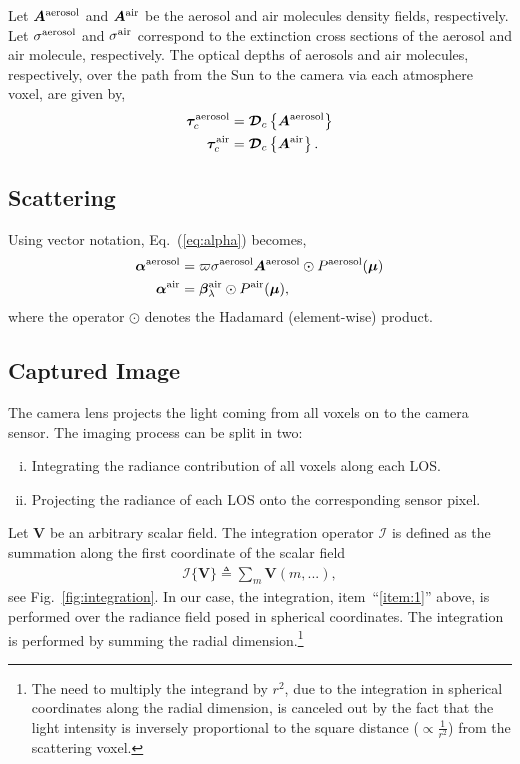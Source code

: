 \documentclass[10pt,twocolumn,letterpaper]{article}
\newcommand{\OpDistance}{\bm{\mathcal{D}}}
\newcommand{\OpInt}{\bm{\mathcal{I}}}
\newcommand{\curly}[1]{\left\{#1\right\}}
\newcommand{\vect}[1]{\bm{#1}}
\newcommand{\mat}[1]{\bm{#1}}
\begin{document}
Let $\mat{A}^{\rm aerosol}$ and $\mat{A}^{\rm air}$ be the aerosol and
air molecules density fields, respectively.  Let $\sigma^{\rm
  aerosol}$ and $ \sigma^{\rm air}$ correspond to the extinction cross
sections of the aerosol and air molecule, respectively.  The optical
depths of aerosols and air molecules, respectively, over the path from
the Sun to the camera via each atmosphere voxel, are given by,
\begin{align}
  \vect{\tau}^{\rm aerosol}_c &= \OpDistance_c \curly{ \mat{A}^{\rm
      aerosol}} \nonumber \\
  \vect{\tau}^{\rm air}_c &= \OpDistance_c \curly{ \mat{A}^{\rm air}}.
  \label{eq:tau}
\end{align}

\subsection{Scattering}
\label{sec:scattering}


\noindent Using vector notation, Eq.~(\ref{eq:alpha}) becomes,
\begin{align}
  \vect{\alpha}^{\rm aerosol} &= \varpi \sigma^{\rm aerosol}
  \mat{A}^{\rm
    aerosol} \odot P^{\rm aerosol}(\vect{\mu}) \nonumber \\
  \vect{\alpha}^{\rm air} &= \vect{\beta}^{\rm air}_{\lambda} \odot
  P^{\rm air}(\vect{\mu}),
  \label{eq:alpha_matrix}
\end{align}
where the operator $\odot$ denotes the Hadamard (element-wise)
product.



\subsection{Captured Image}
\label{sec:captured-image}

The camera lens projects the light coming from all voxels on to the
camera sensor. The imaging process can be split in two:
\begin{enumerate}[i.]
\item \label{item:1} Integrating the radiance contribution of all
  voxels along each LOS.
\item \label{item:2} Projecting the radiance of each LOS onto the
  corresponding sensor pixel.
\end{enumerate}
Let $\mat{V}$ be an arbitrary scalar field. The integration operator
$\OpInt$ is defined as the summation along the first coordinate of the
scalar field
\begin{align}
  \OpInt\{\mat{V}\} \triangleq \sum_m \mat{V}(m,...),
  \label{eq:operator_integral}
\end{align}
see Fig.~\ref{fig:integration}. In our case, the integration,
item~``\ref{item:1}'' above, is performed over the radiance field
posed in spherical coordinates. The integration is performed by
summing the radial dimension.\footnote{The need to multiply the
  integrand by $r^2$, due to the integration in spherical
  coordinates along the radial dimension, is canceled out by the
  fact that the light intensity is inversely proportional to the
  square distance ($\propto\frac{1}{r^2}$) from the scattering voxel.}
\end{document}
